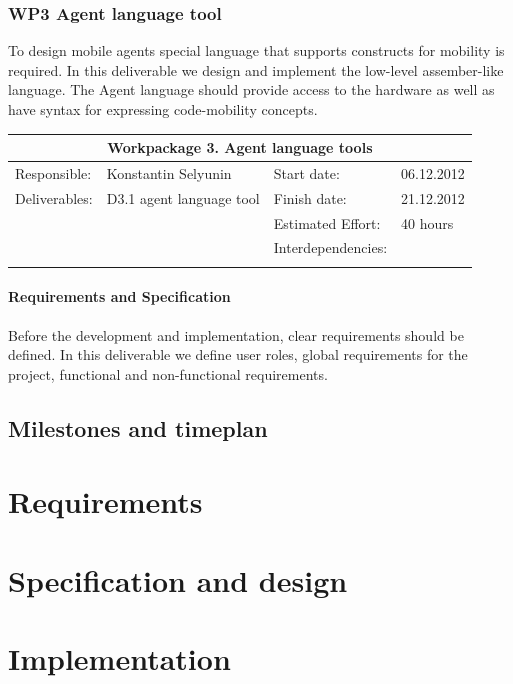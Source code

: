 \documentclass{scrreprt}
\begin{document}
	\subsection{WP3 Agent language tool}

To design mobile agents special language that supports constructs for mobility is required.
In this deliverable we design and implement the low-level assember-like language.
The Agent language should provide access to the hardware as well as have syntax for expressing code-mobility concepts. 

\vspace{0.2in}
\begin{tabular}{|ll|ll|}
\hline \multicolumn{4}{|c|}{\textbf{Workpackage 3. Agent language tools }}\\
\hline
Responsible:	&  Konstantin Selyunin			& Start date:		& 06.12.2012 \\
Deliverables:	&  D3.1 agent language tool		& Finish date:	 	& 21.12.2012\\
		&  					& Estimated Effort: 	& 40 hours \\
		&  					& Interdependencies:	& 	\\
		&  					& 			& 	\\
\hline
\end{tabular}
	\subsubsection{Requirements and Specification}

Before the development and implementation, clear requirements should be defined.
In this deliverable we define user roles, global requirements for the project, functional and non-functional requirements.
	\section{Milestones and timeplan}





\chapter{Requirements}

\chapter{Specification and design}

\chapter{Implementation}
\end{document}
